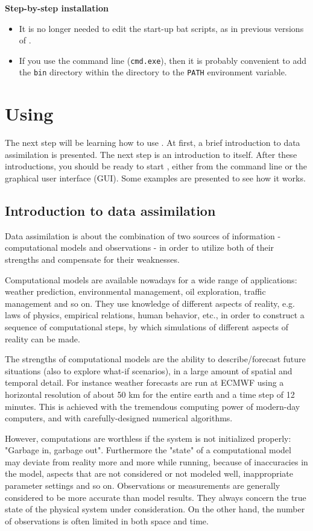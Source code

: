 \textbf{Step-by-step installation}

\begin{itemize}
\item It is no longer needed to edit the start-up bat scripts, as in previous versions of \oda.
\item If you use the command line (\verb|cmd.exe|), then it is probably convenient to add the \verb|bin| directory within the \oda directory to the \verb|PATH| environment variable.
\end{itemize}

\section{Using \oda}
The next step will be learning how to use \oda. At first, a brief introduction to data assimilation is presented. The next step is an introduction to \oda itself. After these introductions, you should be ready to start \oda, either from the command line or the graphical user interface (GUI). Some examples are presented to see how it works.

\subsection{Introduction to data assimilation}
Data assimilation is about the combination of two sources of information - computational models and observations - in order to utilize both of their strengths and compensate for their weaknesses.

Computational models are available nowadays for a wide range of applications: weather prediction, environmental management, oil exploration, traffic management and so on. They use knowledge of different aspects of reality, e.g. laws of physics, empirical relations, human behavior, etc., in order to construct a sequence of computational steps, by which simulations of different aspects of reality can be made.

The strengths of computational models are the ability to describe/forecast future situations (also to explore what-if scenarios), in a large amount of spatial and temporal detail. For instance weather forecasts are run at ECMWF using a horizontal resolution of about 50 km for the entire earth and a time step of 12 minutes. This is achieved with the tremendous computing power of modern-day computers, and with carefully-designed numerical algorithms.

However, computations are worthless if the system is not initialized properly: "Garbage in, garbage out". Furthermore the "state" of a computational model may deviate from reality more and more while running, because of inaccuracies in the model, aspects that are not considered or not modeled well, inappropriate parameter settings and so on. Observations or measurements are generally considered to be more accurate than model results. They always concern the true state of the physical system under consideration. On the other hand, the number of observations is often limited in both space and time.

